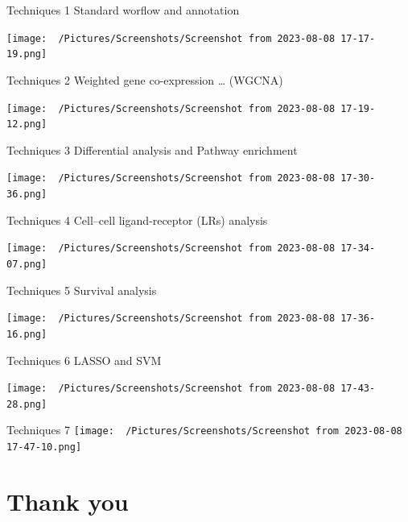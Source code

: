 \documentclass[
  5pt,
  ignorenonframetext,
]{beamer}
\begin{document}
\begin{frame}{Techniques 1}
\protect\hypertarget{techniques-1}{}
Standard worflow and annotation

\texttt{[image: ~/Pictures/Screenshots/Screenshot from 2023-08-08 17-17-19.png]}
\end{frame}

\begin{frame}{Techniques 2}
\protect\hypertarget{techniques-2}{}
Weighted gene co-expression \ldots{} (WGCNA)

\texttt{[image: ~/Pictures/Screenshots/Screenshot from 2023-08-08 17-19-12.png]}
\end{frame}

\begin{frame}{Techniques 3}
\protect\hypertarget{techniques-3}{}
Differential analysis and Pathway enrichment

\texttt{[image: ~/Pictures/Screenshots/Screenshot from 2023-08-08 17-30-36.png]}
\end{frame}

\begin{frame}{Techniques 4}
\protect\hypertarget{techniques-4}{}
Cell--cell ligand‐receptor (LRs) analysis

\texttt{[image: ~/Pictures/Screenshots/Screenshot from 2023-08-08 17-34-07.png]}
\end{frame}

\begin{frame}{Techniques 5}
\protect\hypertarget{techniques-5}{}
Survival analysis

\texttt{[image: ~/Pictures/Screenshots/Screenshot from 2023-08-08 17-36-16.png]}
\end{frame}

\begin{frame}{Techniques 6}
\protect\hypertarget{techniques-6}{}
LASSO and SVM

\texttt{[image: ~/Pictures/Screenshots/Screenshot from 2023-08-08 17-43-28.png]}
\end{frame}

\begin{frame}{Techniques 7}
\protect\hypertarget{techniques-7}{}
\texttt{[image: ~/Pictures/Screenshots/Screenshot from 2023-08-08 17-47-10.png]}
\end{frame}

\hypertarget{thank-you}{%
\section{Thank you}\label{thank-you}}
\end{document}
